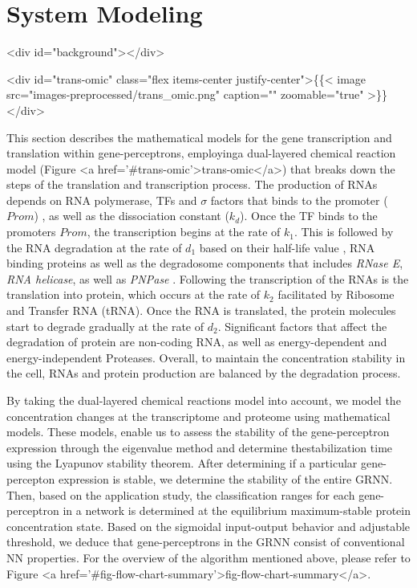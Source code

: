 \documentclass[twocolumn]{biophys-new}
\begin{document}
{{\section{System Modeling} <div id="background"></div>



<div id="trans-omic" class="flex items-center justify-center">\{\{< image src="images-preprocessed/trans_omic.png" caption="" zoomable="true" >\}\}</div>



This section describes the mathematical models for the gene transcription and translation within gene-perceptrons, employinga dual-layered chemical reaction model (Figure <a href='#trans-omic'>trans-omic</a>) that breaks down the steps of the translation and transcription process. 
The production of RNAs depends on RNA polymerase, TFs and $\sigma$ factors that binds to the promoter ($Prom$) \cite{wang2021direct}, as well as the dissociation constant ($k_d$). Once the TF binds to the promoters $Prom$, the transcription begins at the rate of $k_1$. This is followed by the RNA degradation at the rate of $d_1$ based on their half-life value \cite{bernstein2002global}, RNA binding proteins \cite{holmqvist2018rna} as well as the degradosome components that includes \emph{RNase E}, \emph{RNA helicase}, as well as \emph{PNPase} \cite{tejada2020bacterial}. Following the transcription of the RNAs is the translation into protein, which occurs at the rate of $k_2$ facilitated by Ribosome and Transfer RNA (tRNA). Once the RNA is translated, the protein molecules start to degrade gradually at the rate of $d_2$. Significant factors that affect the degradation of protein are non-coding RNA, as well as energy-dependent and energy-independent Proteases. Overall, to maintain the concentration stability in the cell, RNAs and protein production are balanced by the degradation process.

By taking the dual-layered chemical reactions model into account, we model the concentration changes at the transcriptome and proteome using mathematical models. These models, enable us to assess the stability of the gene-perceptron expression through the eigenvalue method and determine thestabilization time using the Lyapunov stability theorem. 
After determining if a particular gene-percepton expression is stable, we determine the stability of the entire GRNN. Then, based on the application study, the classification ranges for each gene-perceptron in a network is determined at the equilibrium maximum-stable protein concentration state. Based on the sigmoidal input-output behavior and adjustable threshold, we deduce that gene-perceptrons in the GRNN consist of conventional NN properties.
 For the overview of the algorithm mentioned above, please refer to Figure <a href='#fig-flow-chart-summary'>fig-flow-chart-summary</a>. 

}}
\end{document}
